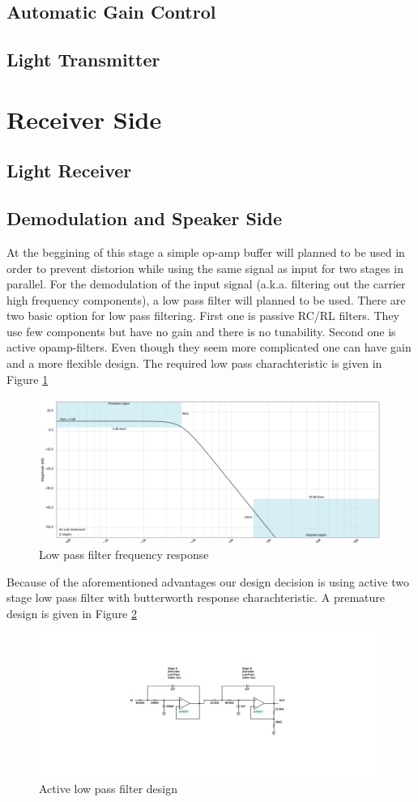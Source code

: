 \documentclass[a4paper,10pt]{IEEEtran}
\begin{document}
\subsection{Automatic Gain Control}
\subsection{Light Transmitter}
\section{Receiver Side}
\subsection{Light Receiver}
\subsection{Demodulation and Speaker Side}
At the beggining of this stage a simple op-amp buffer will planned to be used in order to prevent distorion while using the same signal as input for two stages in parallel. For the demodulation of the input signal (a.k.a. filtering out the carrier high frequency components), a low pass filter will planned to be used. There are two basic  option for low pass filtering. First one is passive RC/RL filters. They use few components but have no gain and there is no tunability. Second one is active opamp-filters. Even though they seem more complicated one can have gain and a more flexible design. The required low pass charachteristic is given in Figure \ref*{low_pass_plot}
\begin{figure}[H]
    \centering
    \includegraphics[width = 0.75\linewidth]{active_low_pass.png}
    \caption{Low pass filter frequency response}
    \label{low_pass_plot}    
\end{figure} 
Because of the aforementioned advantages our design decision is using active two stage low pass filter with butterworth response charachteristic. A premature design is given in Figure \ref*{low_pass_sch}
\begin{figure}[H]
    \centering
    \includegraphics[width = 0.75\linewidth]{active_low_pass_circuit.png}
    \caption{Active low pass filter design}
    \label{low_pass_sch}    
\end{figure} 
\end{document}
